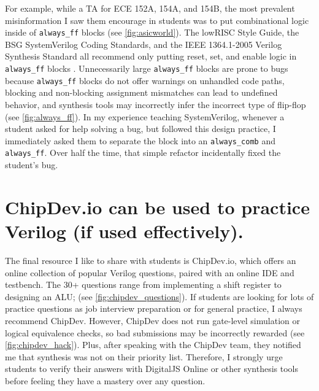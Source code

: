 


For example, while a TA for ECE 152A, 154A, and 154B, the most prevalent misinformation I saw them encourage in students was to put combinational logic inside of \texttt{always_ff} blocks (see \autoref{fig:asicworld}).
The lowRISC Style Guide, the BSG SystemVerilog Coding Standards, and the IEEE 1364.1-2005 Verilog Synthesis Standard all recommend only putting reset, set, and enable logic in \texttt{always_ff} blocks \cite{lowRISCstyleguides, BSGstyleguide, 1364.1-2005}.
Unnecessarily large \texttt{always_ff} blocks are prone to bugs because \texttt{always_ff} blocks do not offer warnings on unhandled code paths, blocking and non-blocking assignment mismatches can lead to undefined behavior, and synthesis tools may incorrectly infer the incorrect type of flip-flop (see \autoref{fig:always_ff}).
In my experience teaching SystemVerilog, whenever a student asked for help solving a bug, but followed this design practice, I immediately asked them to separate the block into an \texttt{always_comb} and \texttt{always_ff}.
Over half the time, that simple refactor incidentally fixed the student's bug.

\FloatBarrier

\section{ChipDev.io can be used to practice Verilog (if used effectively).}




The final resource I like to share with students is ChipDev.io, which offers an online collection of popular Verilog questions, paired with an online IDE and testbench.
The 30+ questions range from implementing a shift register to designing an ALU; (see \autoref{fig:chipdev_questions}).
If students are looking for lots of practice questions as job interview preparation or for general practice, I always recommend ChipDev.
However, ChipDev does not run gate-level simulation or logical equivalence checks, so bad submissions may be incorrectly rewarded (see \autoref{fig:chipdev_hack}).
Plus, after speaking with the ChipDev team, they notified me that synthesis was not on their priority list.
Therefore, I strongly urge students to verify their answers with DigitalJS Online or other synthesis tools before feeling they have a mastery over any question.
